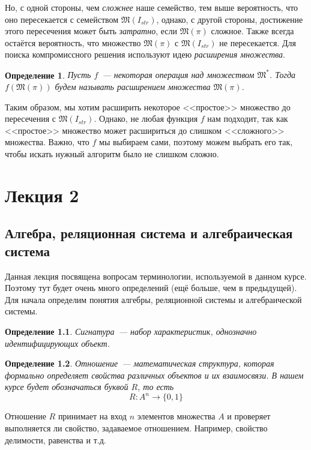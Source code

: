 \documentclass[a4paper, 12pt]{report}
\newtheorem{definition}{Определение}[chapter]
\begin{document}
Но, с одной стороны, чем \emph{сложнее} наше семейство, тем выше вероятность, что оно пересекается с семейством $\mathfrak{M}(I_{str})$, однако, с другой стороны, достижение этого пересечения может быть \emph{затратно}, если $\mathfrak{M}(\pi)$ сложное. Также всегда остаётся вероятность, что множество $\mathfrak{M}(\pi)$ с $\mathfrak{M}(I_{str})$ не пересекается. Для поиска компромиссного решения используют идею \emph{расширения множества}.

\begin{definition}
Пусть $f$~--- некоторая операция над множеством $\mathfrak{M}^*$. Тогда $f(\mathfrak{M}(\pi))$ будем называть расширением множества $\mathfrak{M}(\pi)$.
\end{definition}

Таким образом, мы хотим расширить некоторое <<простое>> множество до пересечения с $\mathfrak{M}(I_{str})$. Однако, не любая функция $f$ нам подходит, так как <<простое>> множество может расшириться до слишком <<сложного>> множества. Важно, что $f$ мы выбираем сами, поэтому можем выбрать его так, чтобы искать нужный алгоритм было не слишком сложно.

\chapter{Лекция 2}
\section{Алгебра, реляционная система и алгебраическая система}
Данная лекция посвящена вопросам терминологии, используемой в данном курсе. Поэтому тут будет очень много определений (ещё больше, чем в предыдущей). Для начала определим понятия алгебры, реляционной системы и алгебраической системы.

\begin{definition}
Сигнатура~--- набор характеристик, однозначно идентифицирующих объект.
\end{definition}

\begin{definition}
Отношение~--- математическая структура, которая формально определяет свойства различных объектов и их взаимосвязи. В нашем курсе будет обозначаться буквой $R$, то есть
\[
R: A^n \rightarrow \{ 0, 1 \}
\]
\end{definition}
Отношение $R$ принимает на вход $n$ элементов множества $A$ и проверяет выполняется ли свойство, задаваемое отношением. Например, свойство делимости, равенства и т.д.
\end{document}
